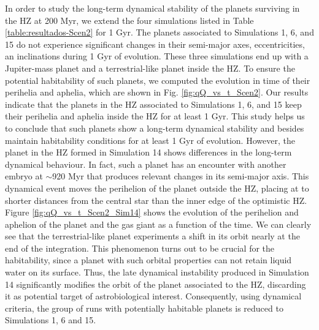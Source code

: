 \documentclass{aa}
\begin{document}
In order to study the long-term dynamical stability of the planets surviving in the HZ at 200 Myr, we extend the four simulations
listed in
Table \ref{table:resultados-Scen2} for 1 Gyr. The planets associated to Simulations 1, 6, and 15 do not experience significant
changes in their semi-major axes, eccentricities, an inclinations during 1 Gyr of evolution. These three simulations end up with
a Jupiter-mass planet and a terrestrial-like planet inside the HZ. To ensure the potential habitability of such planets, we computed
the evolution in time of their perihelia and aphelia, which are shown in Fig. \ref{fig:qQ_vs_t_Scen2}. Our results indicate that
the planets in the HZ associated to Simulations 1, 6, and 15 keep their perihelia and aphelia inside the HZ for at least 1 Gyr.
This study helps us to conclude that such planets show a long-term dynamical stability and besides maintain habitability conditions
for at least 1 Gyr of evolution.
However, the planet in the HZ formed in Simulation 14 shows differences in the long-term dynamical behaviour. In fact, such a planet
has an encounter with another embryo at $\sim$920 Myr that produces relevant changes in its semi-major axis.
This dynamical event moves the perihelion of the planet outside the HZ, placing at to shorter distances from the central star than the
inner edge of the optimistic HZ. 
Figure \ref{fig:qQ_vs_t_Scen2_Sim14} shows the evolution of the perihelion and aphelion of the planet and the gas giant as a function
of the time. We can clearly see that the terrestrial-like planet experiments a shift in its orbit nearly at the end of the integration.
This phenomenon turns out to be crucial for the habitability, since a planet with such orbital properties
can not retain liquid water on its surface. Thus, the late dynamical instability produced in Simulation 14 significantly modifies
the orbit of the planet associated to the HZ, discarding it as potential target of astrobiological interest.
Consequently, using dynamical criteria, the group of runs with potentially habitable planets is reduced to Simulations 1, 6 and 15.
\end{document}
